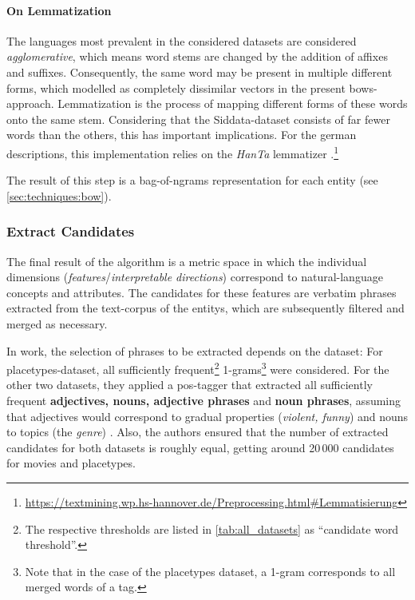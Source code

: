 \paragraph{On Lemmatization}
The languages most prevalent in the considered datasets are considered \textit{agglomerative}, which means word stems are changed by the addition of affixes and suffixes. Consequently, the same word may be present in multiple different forms, which modelled as completely dissimilar vectors in the present \glspl{bow}-approach. Lemmatization is the process of mapping different forms of these words onto the same stem. Considering that the Siddata-dataset consists of far fewer words than the others, this has important implications. For the german descriptions, this implementation relies on the \textit{HanTa} lemmatizer \cite{Wartena2020}.\footnote{\url{https://textmining.wp.hs-hannover.de/Preprocessing.html\#Lemmatisierung}}

The result of this step is a bag-of-ngrams representation for each entity (see \autoref{sec:techniques:bow}).


\subsubsection{Extract Candidates}
\label{sec:extract_cands}

The final result of the algorithm is a metric space in which the individual dimensions (\emph{features}/\emph{interpretable directions}) correspond to natural-language concepts and attributes. The candidates for these features are verbatim phrases extracted from the text-corpus of the \glspl{entity}, which are subsequently filtered and merged as necessary.

In  work, the selection of phrases to be extracted depends on the dataset: For placetypes-dataset, all sufficiently frequent\footnote{\label{fnote:cand_thresholds}The respective thresholds are listed in \autoref{tab:all_datasets} as ``candidate word threshold''.} 1-grams\footnote{Note that in the case of the placetypes dataset, a 1-gram corresponds to all merged words of a tag.} were considered. For the other two datasets, they applied a \gls{pos}-tagger that extracted all sufficiently frequent \textbf{adjectives, nouns, adjective phrases} and \textbf{noun phrases}, assuming that adjectives would correspond to gradual properties (\eg \textit{violent, funny}) and nouns to topics (\eg the \textit{genre}) \cite[Sec. 4.2.1]{Derrac2015}. Also, the authors ensured that the number of extracted candidates for both datasets is roughly equal, getting around 20\,000 candidates for movies and placetypes.


